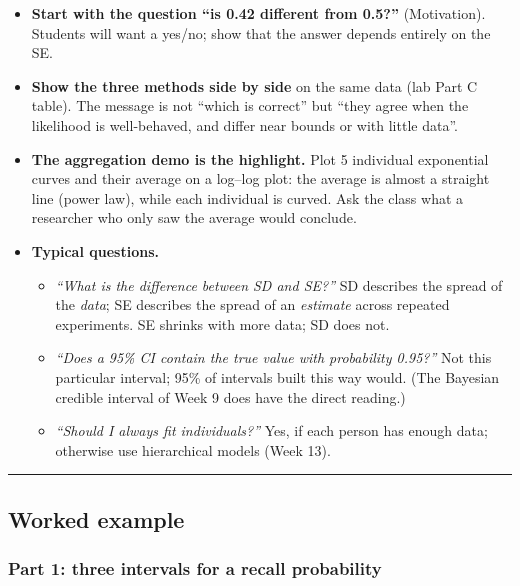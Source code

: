 \begin{itemize}
\tightlist
\item
  \textbf{Start with the question ``is 0.42 different from 0.5?''}
  (Motivation). Students will want a yes/no; show that the answer
  depends entirely on the SE.
\item
  \textbf{Show the three methods side by side} on the same data (lab
  Part C table). The message is not ``which is correct'' but ``they
  agree when the likelihood is well-behaved, and differ near bounds or
  with little data''.
\item
  \textbf{The aggregation demo is the highlight.} Plot 5 individual
  exponential curves and their average on a log--log plot: the average
  is almost a straight line (power law), while each individual is
  curved. Ask the class what a researcher who only saw the average would
  conclude.
\item
  \textbf{Typical questions.}

  \begin{itemize}
  \tightlist
  \item
    \emph{``What is the difference between SD and SE?''} SD describes
    the spread of the \emph{data}; SE describes the spread of an
    \emph{estimate} across repeated experiments. SE shrinks with more
    data; SD does not.
  \item
    \emph{``Does a 95\% CI contain the true value with probability
    0.95?''} Not this particular interval; 95\% of intervals built this
    way would. (The Bayesian credible interval of Week 9 does have the
    direct reading.)
  \item
    \emph{``Should I always fit individuals?''} Yes, if each person has
    enough data; otherwise use hierarchical models (Week 13).
  \end{itemize}
\end{itemize}

\begin{center}\rule{0.5\linewidth}{0.5pt}\end{center}


\subsection{Worked example}

\subsubsection{Part 1: three intervals for a recall probability}

